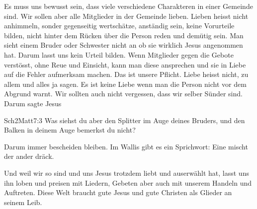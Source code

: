 Es muss uns bewusst sein, dass viele verschiedene Charakteren in einer Gemeinde sind. Wir sollen aber alle Mitglieder in der Gemeinde lieben. Lieben heisst nicht anhimmeln, sonder gegenseitig wertschätze, anständig sein, keine Vorurteile bilden, nicht hinter dem Rücken über die Person reden und demütig sein. Man sieht einem Bruder oder Schwester nicht an ob sie wirklich Jesus angenommen hat. Darum lasst uns kein Urteil bilden. Wenn Mitglieder gegen die Gebote verstösst, ohne Reue und Einsicht, kann man diese ansprechen und sie in Liebe auf die Fehler aufmerksam machen. Das ist unsere Pflicht. Liebe heisst nicht, zu allem und alles ja sagen. Es ist keine Liebe wenn man die Person nicht vor dem Abgrund warnt.
Wir sollten auch nicht vergessen, dass wir selber Sünder sind. Darum sagte Jesus

\begin{bibeltext}{Sch2}{Matt}{7:3}
    Was siehst du aber den Splitter im Auge deines Bruders, und den Balken in deinem
Auge bemerkst du nicht?
\end{bibeltext}

Darum immer bescheiden bleiben. Im Wallis gibt es ein Sprichwort: \glqq{}Eine mischt der ander dräck\grqq.

Und weil wir so sind und uns Jesus trotzdem liebt und auserwählt hat, lasst uns ihn loben und preisen mit Liedern, Gebeten aber auch mit unserem Handeln und Auftreten. Diese Welt braucht gute Jesus und gute Christen als Glieder an seinem Leib.

